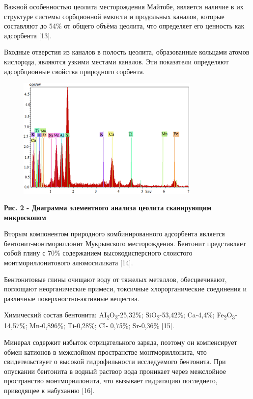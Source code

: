 Важной особенностью цеолита месторождения Майтобе, является наличие в их
структуре системы сорбционной емкости и продольных каналов, которые
составляют до 54\% от общего объёма цеолита, что определяет его ценность
как адсорбента {[}13{]}.

Входные отверстия из каналов в полость цеолита, образованные кольцами
атомов кислорода, являются узкими местами каналов. Эти показатели
определяют адсорбционные свойства природного сорбента.

\begin{figure}[H]
	\centering
	\includegraphics[width=0.8\textwidth]{media/chem/image2}
	\caption*{}
\end{figure}


{\bfseries Рис. 2 - Диаграмма элементного анализа цеолита сканирующим
микроскопом}

Вторым компонентом природного комбинированного адсорбента является
бентонит-монтмориллонит Мукрынского месторождения. Бентонит представляет
собой глину с 70\% содержанием высокодисперсного слоистого
монтмориллонитового алюмосиликата {[}14{]}.

Бентонитовые глины очищают воду от тяжелых металлов, обесцвечивают,
поглощают неорганические примеси, токсичные хлорорганические соединения
и различные поверхностно-активные вещества.

Химический состав бентонита:
AI\textsubscript{2}O\textsubscript{3}-25,32\%;
SiO\textsubscript{2}-53,42\%; Ca-4,4\%;
Fe\textsubscript{2}O\textsubscript{3}-14,57\%; Mn-0,896\%; Ti-0,28\%;
Cl- 0,75\%; Sr-0,36\% {[}15{]}.

Минерал содержит избыток отрицательного заряда, поэтому он компенсирует
обмен катионов в межслойном пространстве монтмориллонита, что
свидетельствует о высокой гидрофильности исследуемого бентонита. При
опускании бентонита в водный раствор вода проникает через межслойное
пространство монтмориллонита, что вызывает гидратацию последнего,
приводящее к набуханию {[}16{]}.

